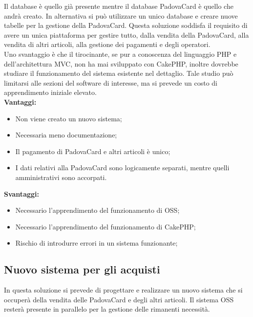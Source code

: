 Il database  è quello già presente mentre il database PadovaCard è quello che andrà creato. In alternativa si può utilizzare un unico database e creare nuove tabelle per la gestione della PadovaCard.
Questa soluzione soddisfa il requisito di avere un unica piattaforma per gestire tutto, dalla vendita della PadovaCard, alla vendita di altri articoli, alla gestione dei pagamenti e degli operatori.\\

Uno svantaggio è che il tirocinante, se pur a conoscenza del linguaggio PHP e dell'architettura MVC, non ha mai sviluppato con CakePHP, inoltre dovrebbe studiare il funzionamento del sistema esistente nel dettaglio. Tale studio può limitarsi alle sezioni del software di interesse, ma si prevede un costo di apprendimento iniziale elevato.\\
\textbf{Vantaggi:}
\begin{itemize}
\item Non viene creato un nuovo sistema;
\item Necessaria meno documentazione;
\item Il pagamento di PadovaCard e altri articoli è unico;
\item I dati relativi alla PadovaCard sono logicamente separati, mentre quelli amministrativi sono accorpati.
\end{itemize}
\textbf{Svantaggi:}
\begin{itemize}
\item Necessario l'apprendimento del funzionamento di OSS;
\item Necessario l'apprendimento del funzionamento di CakePHP;
\item Rischio di introdurre errori in un sistema funzionante;
\end{itemize}

\subsection{Nuovo sistema per gli acquisti}
In questa soluzione si prevede di progettare e realizzare un nuovo sistema che si occuperà della vendita delle PadovaCard e degli altri articoli. Il sistema OSS resterà presente in parallelo per la gestione delle rimanenti necessità.

